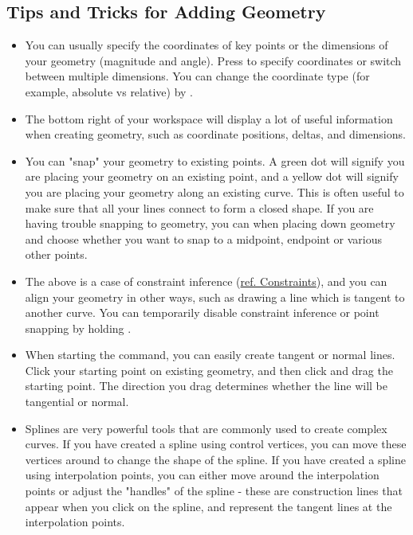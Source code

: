 \subsection{Tips and Tricks for Adding Geometry}


\begin{itemize}
    \item You can usually specify the coordinates of key points or the dimensions of your geometry (magnitude and angle). Press  to specify coordinates or switch between multiple dimensions. You can change the coordinate type (for example, absolute vs relative) by .
    \item The bottom right of your workspace will display a lot of useful information when creating geometry, such as coordinate positions, deltas, and dimensions.
    \item You can "snap" your geometry to existing points. A green dot will signify you are placing your geometry on an existing point, and a yellow dot will signify you are placing your geometry along an existing curve. This is often useful to make sure that all your lines connect to form a closed shape. If you are having trouble snapping to geometry, you can  when placing down geometry and choose whether you want to snap to a midpoint, endpoint or various other points.
    \item The above is a case of constraint inference (\hyperref[section: Constraints and Dimensions]{ref. Constraints}), and you can align your geometry in other ways, such as drawing a line which is tangent to another curve. You can temporarily disable constraint inference or point snapping by holding .
    \item When starting the  command, you can easily create tangent or normal lines. Click your starting point on existing geometry, and then click and drag the starting point. The direction you drag determines whether the line will be tangential or normal.
    \item Splines are very powerful tools that are commonly used to create complex curves. If you have created a spline using control vertices, you can move these vertices around to change the shape of the spline. If you have created a spline using interpolation points, you can either move around the interpolation points or adjust the "handles" of the spline - these are construction lines that appear when you click on the spline, and represent the tangent lines at the interpolation points.
\end{itemize}

